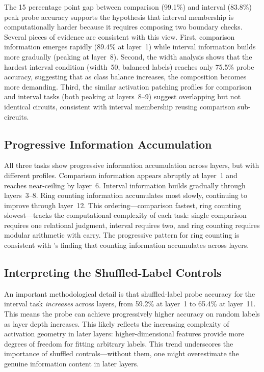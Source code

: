 The 15 percentage point gap between comparison (99.1\%) and interval (83.8\%) peak probe accuracy supports the hypothesis that interval membership is computationally harder because it requires composing two boundary checks. Several pieces of evidence are consistent with this view. First, comparison information emerges rapidly (89.4\% at layer~1) while interval information builds more gradually (peaking at layer~8). Second, the width analysis shows that the hardest interval condition (width~50, balanced labels) reaches only 75.5\% probe accuracy, suggesting that as class balance increases, the composition becomes more demanding. Third, the similar activation patching profiles for comparison and interval tasks (both peaking at layers~8--9) suggest overlapping but not identical circuits, consistent with interval membership reusing comparison sub-circuits.

\subsection{Progressive Information Accumulation}

All three tasks show progressive information accumulation across layers, but with different profiles. Comparison information appears abruptly at layer~1 and reaches near-ceiling by layer~6. Interval information builds gradually through layers~3--8. Ring counting information accumulates most slowly, continuing to improve through layer~12. This ordering---comparison fastest, ring counting slowest---tracks the computational complexity of each task: single comparison requires one relational judgment, interval requires two, and ring counting requires modular arithmetic with carry. The progressive pattern for ring counting is consistent with \citet{hasani2026mechanistic}'s finding that counting information accumulates across layers.

\subsection{Interpreting the Shuffled-Label Controls}

An important methodological detail is that shuffled-label probe accuracy for the interval task \emph{increases} across layers, from 59.2\% at layer~1 to 65.4\% at layer~11. This means the probe can achieve progressively higher accuracy on random labels as layer depth increases. This likely reflects the increasing complexity of activation geometry in later layers: higher-dimensional features provide more degrees of freedom for fitting arbitrary labels. This trend underscores the importance of shuffled controls---without them, one might overestimate the genuine information content in later layers.

